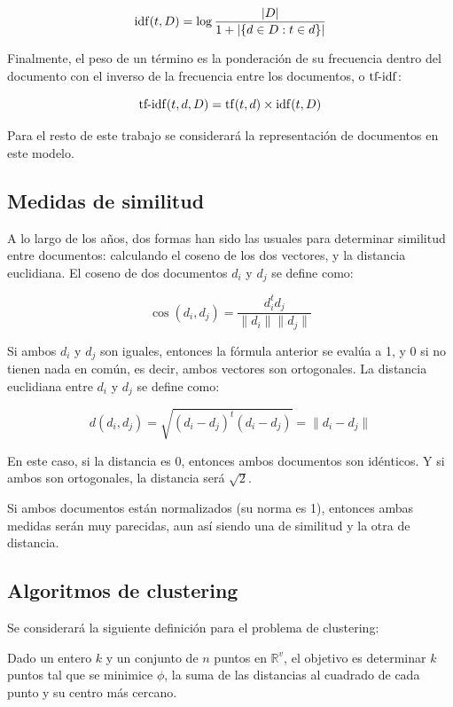     $$\operatorname{idf}(t, D) = \log \frac{ |D| } {1 + |\{d \in D : t \in d\}| }$$

    Finalmente, el peso de un término es la ponderación de su
    frecuencia dentro del documento con el inverso de la frecuencia
    entre los documentos, o $\operatorname{tf-idf}$:

    $$\operatorname{tf-idf}(t,d,D) = \operatorname{tf}(t,d) \times \operatorname{idf}(t,D)$$

    Para el resto de este trabajo se considerará la representación de
    documentos en este modelo.

\subsection{Medidas de similitud}
\label{sec-2.2.2}


    A lo largo de los años, dos formas han sido las usuales para
    determinar similitud entre
    documentos\cite{Zhao02criterionfunctions}: calculando el coseno de
    los dos vectores, y la distancia euclidiana. El coseno de dos documentos 
    $d_i$ y $d_j$ se define como:

    $$\cos(d_i, d_j) = \frac{d_i^td_j}{\|d_i\|\|d_j\|}$$

    Si ambos $d_i$ y $d_j$ son iguales, entonces la fórmula anterior
    se evalúa a 1, y 0 si no tienen nada en común, es decir, ambos
    vectores son ortogonales. La distancia euclidiana entre $d_i$ y $d_j$ 
    se define como:

    $$d(d_i,d_j) = \sqrt{(d_i-d_j)^t(d_i-d_j)} = \|d_i-d_j\|$$

    En este caso, si la distancia es 0, entonces ambos documentos son
    idénticos. Y si ambos son ortogonales, la distancia será
    $\sqrt{2}$.

    Si ambos documentos están normalizados (su norma es 1), entonces
    ambas medidas serán muy parecidas, aun así siendo una de similitud
    y la otra de distancia.

\subsection{Algoritmos de clustering}
\label{sec-2.2.3}


    Se considerará la siguiente definición para el problema de
    clustering:

    Dado un entero $k$ y un conjunto de $n$ puntos en $\mathbb{R}^v$,
    el objetivo es determinar $k$ puntos tal que se minimice $\phi$,
    la suma de las distancias al cuadrado de cada punto y su centro
    más cercano.

